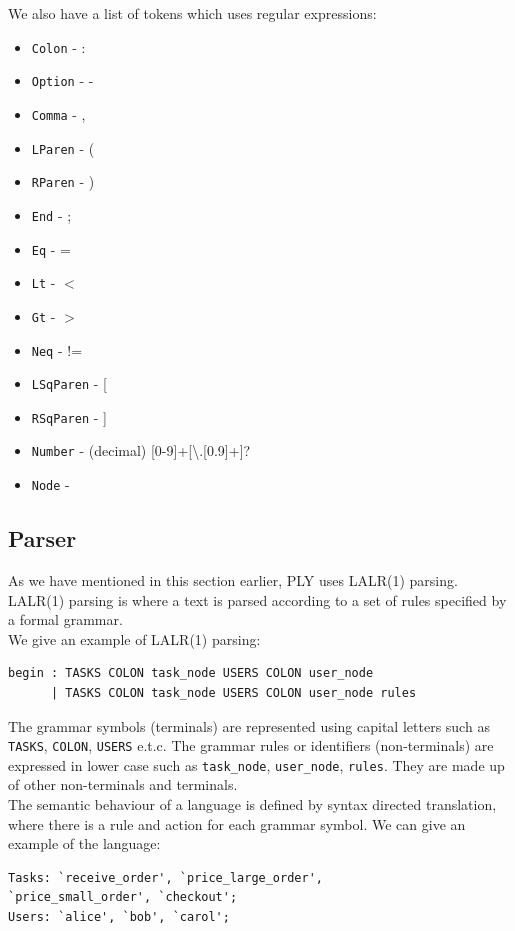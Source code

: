 \documentclass[a4paper]{report}
\begin{document}
We also have a list of tokens which uses regular expressions:
\begin{itemize}
\item \texttt{Colon} - : 
\item \texttt{Option} - -
\item \texttt{Comma} - ,
\item \texttt{LParen} - (
\item \texttt{RParen} - )
\item \texttt{End} - ;
\item \texttt{Eq} - =
\item \texttt{Lt} - $<$
\item \texttt{Gt} - $>$
\item \texttt{Neq} - !=
\item \texttt{LSqParen} - [
\item \texttt{RSqParen} - ]
\item \texttt{Number} - (decimal)  [0-9]+[\textbackslash.[0.9]+]?
\item \texttt{Node} - 
\end{itemize}

\subsection{Parser}
As we have mentioned in this section earlier, PLY uses LALR(1) parsing. LALR(1) parsing is where a text is parsed according to a set of rules specified by a formal grammar.\\
We give an example of LALR(1) parsing:
\lstset{numbers=none, showspaces=false,
    showstringspaces=false, tabsize=2, breaklines=true,
    xleftmargin=5.0ex,
}
\begin{lstlisting}[frame=single]
begin : TASKS COLON task_node USERS COLON user_node
      | TASKS COLON task_node USERS COLON user_node rules
\end{lstlisting}

The grammar symbols (terminals) are represented using capital letters such as \texttt{TASKS}, \texttt{COLON}, \texttt{USERS} e.t.c. The grammar rules or identifiers (non-terminals) are expressed in lower case such as \texttt{task\_node}, \texttt{user\_node}, \texttt{rules}. They are made up of other non-terminals and terminals.\\	

The semantic behaviour of a language is defined by syntax directed translation, where there is a rule and action for each grammar symbol. We can give an example of the language:
\lstset{numbers=none, showspaces=false,
    showstringspaces=false, tabsize=2, breaklines=true,
    xleftmargin=5.0ex,
}
\begin{lstlisting}[frame=single]
Tasks: `receive_order', `price_large_order', 
`price_small_order', `checkout'; 
Users: `alice', `bob', `carol';
\end{lstlisting}
\end{document}
